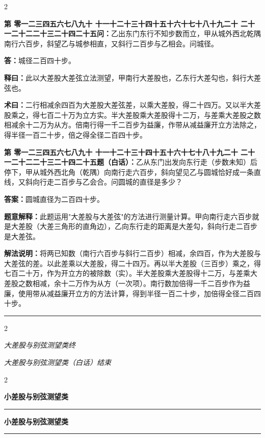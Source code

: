 \documentclass[10pt,a4paper]{article}
\newcommand{\longline}{\noindent\rule{\textwidth}{0.4pt}}
\newcounter{probnum}
\newcounter{probnumvol}[section]
\newcommand{\chnum}[1]{%
  \ifcase#1 零\or 一\or 二\or 三\or 四\or 五\or 六\or 七\or 八\or 九\or 十\or
    十一\or 十二\or 十三\or 十四\or 十五\or 十六\or 十七\or 十八\or 十九\or 二十\or
    二十一\or 二十二\or 二十三\or 二十四\or 二十五\fi}
\newcommand{\problemclassical}[1]{%
  \stepcounter{probnumvol}%
  \par\noindent
  \textcolor{classicalcolor}{\textbf{第\chnum{\value{probnumvol}}问：}}#1\par\smallskip
}
\newcommand{\problemmodern}[1]{%
  \par\noindent
  \textcolor{moderncolor}{\textbf{第\chnum{\value{probnumvol}}题（白话）：}}#1\par\smallskip
}
\newcommand{\answerclassical}[1]{%
  \par\noindent\textcolor{classicalcolor}{\textbf{答：}}#1\par
}
\newcommand{\answermodern}[1]{%
  \par\noindent\textcolor{moderncolor}{\textbf{答案：}}#1\par
}
\newcommand{\shiyiclassical}[1]{%
  \par\noindent\textcolor{classicalcolor}{\textbf{释曰：}}#1\par
}
\newcommand{\shiyimodern}[1]{%
  \par\noindent\textcolor{moderncolor}{\textbf{题意解释：}}#1\par
}
\newcommand{\shuyueclassical}[1]{%
  \par\noindent\textcolor{classicalcolor}{\textbf{术曰：}}#1\par
}
\newcommand{\shuyuemodern}[1]{%
  \par\noindent\textcolor{moderncolor}{\textbf{解法说明：}}#1\par
}
\newcommand{\volheaderclassical}[1]{%
  \begin{center}{\large\bfseries\color{volcolor} #1}\end{center}
  \vspace{0.3cm}
  \longline
  \vspace{0.3cm}
}
\newcommand{\volheadermodern}[1]{%
  \begin{center}{\large\bfseries\color{volcolor} #1}\end{center}
  \vspace{0.3cm}
  \longline
  \vspace{0.3cm}
}
\newcommand{\endclassical}[1]{%
  \vspace{0.3cm}
  \begin{center}\textit{#1}\end{center}
}
\newcommand{\endmodern}[1]{%
  \vspace{0.3cm}
  \begin{center}\textit{#1}\end{center}
}
\begin{document}
\begin{paracol}{2}

\problemclassical{乙出东门东行不知步数而立，甲从城外西北乾隅南行六百步，斜望乙与城参相直，又斜行二百步与乙相会。问城径。}

\answerclassical{城径二百四十步。}

\shiyiclassical{此以大差股大差弦立法测望，甲南行大差股也，乙东行大差勾也，斜行大差弦也。}

\shuyueclassical{二行相减余四百为大差股大差弦差，以乘大差股，得二十四万。又以半大差股乘之，得七百二十万为立方实。半大差股乘大差股得十二万，与差乘大差股之数相减余十二万为从方。倍南行得一千二百步为益廉，作带从减益廉开立方法除之，得半径一百二十步，倍之得全径二百四十步。}

\switchcolumn

\problemmodern{乙从东门出发向东行走（步数未知）后停下，甲从城外西北角（乾隅）向南行走六百步，斜向望见乙与圆城恰好成一条直线，又斜向行走二百步与乙会合。问圆城的直径是多少？}

\answermodern{圆城直径为二百四十步。}

\shiyimodern{此题运用"大差股与大差弦"的方法进行测量计算。甲向南行走六百步就是大差股（大差三角形的直角边），乙向东行走的距离是大差勾，斜向行走二百步是大差弦。}

\shuyuemodern{将两已知数（南行六百步与斜行二百步）相减，余四百，作为大差股与大差弦的差。以此差乘以大差股，得二十四万。再以半大差股（三百步）乘之，得七百二十万，作为开立方的被除数（实）。半大差股乘大差股得十二万，与差乘大差股之数相减，余十二万作为从方（一次项）。南行数加倍得一千二百步作为益廉，使用带从减益廉开立方的方法计算，得到半径一百二十步，加倍得全径二百四十步。}

\end{paracol}

\vspace{0.5cm}
\longline
\begin{paracol}{2}
\endclassical{大差股与别弦测望类终}
\switchcolumn
\endmodern{大差股与别弦测望类（白话）结束}
\end{paracol}

\newpage

\setcounter{probnumvol}{0}

\begin{paracol}{2}

\volheaderclassical{小差股与别弦测望类}

\switchcolumn

\volheadermodern{小差股与别弦测望类}

\end{paracol}
\end{document}
